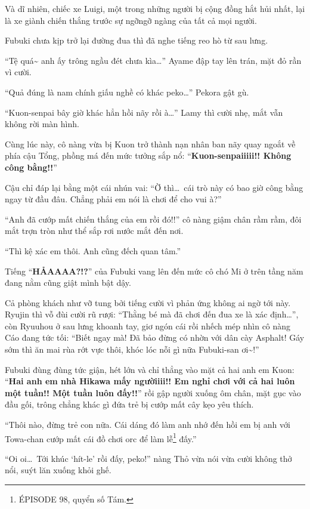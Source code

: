 \documentclass[../main.tex]{subfiles}
\begin{document}
Và dĩ nhiên, chiếc xe Luigi, một trong những người bị cộng đồng hắt hủi nhất, lại là xe giành chiến thắng trước sự ngỡngỡ ngàng của tất cả mọi người.

Fubuki chưa kịp trở lại đường đua thì đã nghe tiếng reo hò từ sau lưng.

``Tệ quá\~{} anh ấy trông ngầu đét chưa kìa\dots'' Ayame đập tay lên trán, mặt đỏ rần vì cười.

``Quả đúng là nam chính giấu nghề có khác peko\dots'' Pekora gật gù.

``Kuon-senpai bây giờ khác hẳn hồi nãy rồi à\dots'' Lamy thì cười nhẹ, mắt vẫn không rời màn hình.

Cùng lúc này, cô nàng vừa bị Kuon trở thành nạn nhân ban nãy quay ngoắt về phía cậu Tổng, phồng má đến mức tưởng sắp nổ: ``\textbf{Kuon-senpaiiiii!! Không công bằng!!}''

Cậu chỉ đáp lại bằng một cái nhún vai: ``Ờ thì\dots\ cái trò này có bao giờ công bằng ngay từ đầu đâu. Chẳng phải em nói là chơi để cho vui à?''

``Anh đã cướp mất chiến thắng của em rồi đó!!'' cô nàng giậm chân rầm rầm, đôi mắt trợn tròn như thể sắp rơi nước mắt đến nơi.

``Thì kệ xác em thôi. Anh cũng đếch quan tâm.''

Tiếng ``\textbf{HẢAAAA?!?}'' của Fubuki vang lên đến mức cô chó Mi ở trên tầng năm đang nằm cũng giật mình bật dậy.

Cả phòng khách như vỡ tung bởi tiếng cười vì phản ứng không ai ngờ tới này. Ryujin thì vỗ đùi cười rũ rượi: ``Thằng bé mà đã chơi đến đua xe là xác định\dots'', còn Ryuuhou ở sau lưng khoanh tay, giơ ngón cái rồi nhếch mép nhìn cô nàng Cáo đang tức tối: ``Biết ngay mà! Đã bảo đừng có nhờn với dân cày Asphalt! Gáy sớm thì ăn mai rùa rớt vực thôi, khóc lóc nỗi gì nữa Fubuki-san ơi\~{}!''

Fubuki đùng đùng tức giận, hét lớn và chỉ thẳng vào mặt cả hai anh em Kuon: ``\textbf{Hai anh em nhà Hikawa mấy ngườiiii!! Em nghỉ chơi với cả hai luôn một tuần!! Một tuần luôn đấy!!}'' rồi gập người xuống ôm chân, mặt gục vào đầu gối, trông chẳng khác gì đứa trẻ bị cướp mất cây kẹo yêu thích.

``Thôi nào, đừng trẻ con nữa. Cái dáng đó làm anh nhớ đến hồi em bị anh với Towa-chan cướp mất cái đồ chơi orc để làm lễ\footnote{{\flaregothic ÉPISODE 98}, quyển số Tám.} đấy.''

``Oi oi\dots\ Tới khúc `hít-le' rồi đấy, peko!'' nàng Thỏ vừa nói vừa cười không thở nổi, suýt lăn xuống khỏi ghế.
\end{document}
